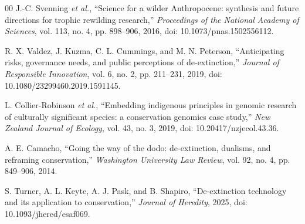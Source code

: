 \documentclass[conference]{IEEEtran}
\begin{document}
\begin{thebibliography}{00}
 J.-C. Svenning \emph{et al.}, ``Science for a wilder Anthropocene: synthesis and future directions for trophic rewilding research,'' \emph{Proceedings of the National Academy of Sciences}, vol. 113, no. 4, pp. 898--906, 2016, doi: 10.1073/pnas.1502556112.

 R. X. Valdez, J. Kuzma, C. L. Cummings, and M. N. Peterson, ``Anticipating risks, governance needs, and public perceptions of de-extinction,'' \emph{Journal of Responsible Innovation}, vol. 6, no. 2, pp. 211--231, 2019, doi: 10.1080/23299460.2019.1591145.

 L. Collier-Robinson \emph{et al.}, ``Embedding indigenous principles in genomic research of culturally significant species: a conservation genomics case study,'' \emph{New Zealand Journal of Ecology}, vol. 43, no. 3, 2019, doi: 10.20417/nzjecol.43.36.

 A. E. Camacho, ``Going the way of the dodo: de-extinction, dualisms, and reframing conservation,'' \emph{Washington University Law Review}, vol. 92, no. 4, pp. 849--906, 2014.

 S. Turner, A. L. Keyte, A. J. Pask, and B. Shapiro, ``De-extinction technology and its application to conservation,'' \emph{Journal of Heredity}, 2025, doi: 10.1093/jhered/esaf069.

\end{thebibliography}
\end{document}
